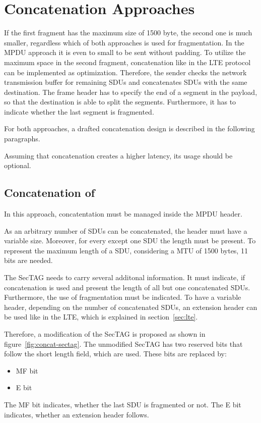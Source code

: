 \section{Concatenation Approaches}
If the first fragment has the maximum size of 1500 byte, the second one is much smaller, regardless which of both approaches is used for fragmentation.
In the \gls{MPDU} approach it is even to small to be sent without padding.
To utilize the maximum space in the second fragment, concatenation like in the \gls{LTE} protocol can be implemented as optimization.
Therefore, the sender checks the network transmission buffer for remaining \glspl{SDU} and concatenates \glspl{SDU} with the same destination.
The frame header has to specify the end of a segment in the payload, so that the destination is able to split the segments.
Furthermore, it has to indicate whether the last segment is fragmented.

For both approaches, a drafted concatenation design is described in the following paragraphs.

Assuming that concatenation creates a higher latency, its usage should be optional.

\subsection{Concatenation of }
\label{par:concat-header}
In this approach, concatentation must be managed inside the \gls{MPDU} header.

As an arbitrary number of \glspl{SDU} can be concatenated, the header must have a variable size.
Moreover, for every except one \gls{SDU} the length must be present.
To represent the maximum length of a \gls{SDU}, considering a \gls{MTU} of 1500 bytes, 11 bits are needed.


The \gls{SecTAG} needs to carry several additonal information.
It must indicate, if concatenation is used and present the length of all but one concatenated \glspl{SDU}.
Furthermore, the use of fragmentation must be indicated.
To have a variable header, depending on the number of concatenated \glspl{SDU}, an extension header can be used like in the \gls{LTE}, which is explained in section~\ref{sec:lte}.

Therefore, a modification of the \gls{SecTAG} is proposed as shown in figure~\ref{fig:concat-sectag}.
The unmodified \gls{SecTAG} has two reserved bits that follow the short length field, which are used.
These bits are replaced by:
\begin{itemize}
  \item \acrfull{MF} bit
  \item \acrfull{E} bit
\end{itemize}
The \gls{MF} bit indicates, whether the last \gls{SDU} is fragmented or not.
The \gls{E} bit indicates, whether an extension header follows.


